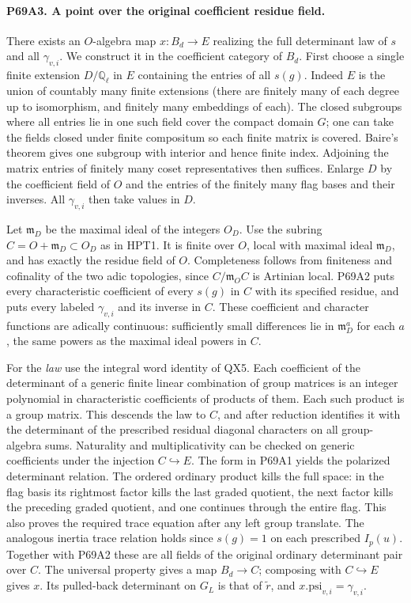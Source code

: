 \paragraph{P69A3. A point over the original coefficient residue field.}
There exists an $O$-algebra map $x:B_d\to E$ realizing the full
determinant law of $s$ and all $\gamma_{v,i}$. We construct it
in the coefficient category of $B_d$. First choose a single finite
extension $D/\mathbb Q_\ell$ in $E$ containing the entries of all
$s(g)$. Indeed $E$ is the union of countably many finite
extensions (there are finitely many of each degree up to
isomorphism, and finitely many embeddings of each).
The closed subgroups where all entries lie in one such field
cover the compact domain $G$; one can take the fields closed
under finite compositum so each finite matrix is covered.
Baire's theorem gives one subgroup with interior and hence
finite index. Adjoining the matrix entries of finitely many
coset representatives then suffices. Enlarge $D$ by the
coefficient field of $O$ and the entries of the finitely many
flag bases and their inverses. All $\gamma_{v,i}$ then take
values in $D$.

Let $\mathfrak m_D$ be the maximal ideal of the integers $O_D$.
Use the subring $C=O+\mathfrak m_D\subset O_D$ as in HPT1.
It is finite over $O$, local with maximal ideal
$\mathfrak m_D$, and has exactly the residue field of $O$.
Completeness follows from finiteness and cofinality of the two
adic topologies, since $C/\mathfrak m_O C$ is Artinian local.
P69A2 puts every characteristic coefficient of every $s(g)$ in
$C$ with its specified residue, and puts every labeled
$\gamma_{v,i}$ and its inverse in $C$. These coefficient and
character functions are adically continuous: sufficiently small
differences lie in $\mathfrak m_D^a$ for each $a$, the same
powers as the maximal ideal powers in $C$.

For the \emph{law} use the integral word identity of QX5.
Each coefficient of the determinant of a generic finite linear
combination of group matrices is an integer polynomial in
characteristic coefficients of products of them. Each such
product is a group matrix. This descends the law to $C$,
and after reduction identifies it with the determinant of the
prescribed residual diagonal characters on all group-algebra
sums. Naturality and multiplicativity can be checked on generic
coefficients under the injection $C\hookrightarrow E$.
The form in P69A1 yields the polarized determinant relation.
The ordered ordinary product kills the full space: in the flag
basis its rightmost factor kills the last graded quotient,
the next factor kills the preceding graded quotient, and one
continues through the entire flag. This also proves the required
trace equation after any left group translate. The analogous
inertia trace relation holds since $s(g)=1$ on each prescribed
$I_p(u)$. Together with P69A2 these are all fields of the
original ordinary determinant pair over $C$. The universal
property gives a map $B_d\to C$; composing with $C\hookrightarrow
E$ gives $x$. Its pulled-back determinant on $G_L$ is that of
$\widetilde r$, and $x.\mathrm{psi}_{v,i}=\gamma_{v,i}$.

